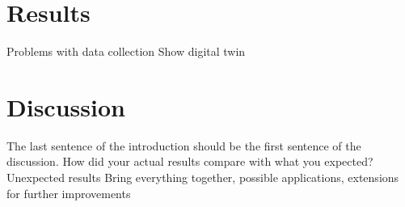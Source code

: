 \documentclass[conference]{IEEEtran}
\begin{document}
    \section{Results}\label{section:results}
    Problems with data collection
    Show digital twin
    \section{Discussion}\label{section:discussion}
    The last sentence of the introduction should be the first sentence of the discussion.
    How did your actual results compare with what you expected?
    Unexpected results
    Bring everything together, possible applications, extensions for further improvements
    
    
    
\end{document}
